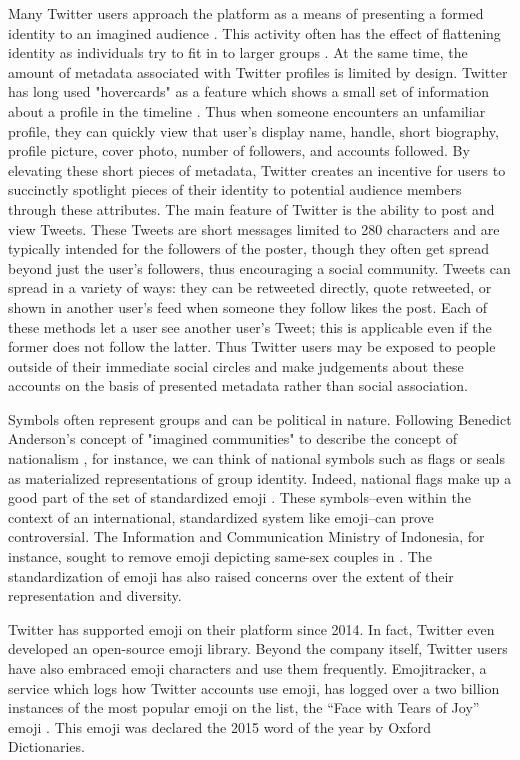 Many Twitter users approach the platform as a means of presenting a
formed identity to an imagined audience \cite{marwick2011tweet}. This
activity often has the effect of flattening identity as individuals
try to fit in to larger groups \cite{boyd2008taken}. At the same time,
the amount of metadata associated with Twitter profiles is limited by
design. Twitter has long used "hovercards" as a feature which shows
a small set of information about a profile in the
timeline \cite{twitterhover}. Thus when someone encounters an
unfamiliar profile, they can quickly view that user’s display name,
handle, short biography, profile picture, cover photo, number of
followers, and accounts followed. By elevating these short pieces of
metadata, Twitter creates an incentive for users to succinctly
spotlight pieces of their identity to potential audience members
through these attributes.  The main feature of Twitter is the ability
to post and view Tweets. These Tweets are short messages limited to
280 characters and are typically intended for the followers of the
poster, though they often get spread beyond just the user’s followers,
thus encouraging a social community. Tweets can spread in a variety of
ways: they can be retweeted directly, quote retweeted, or shown in
another user’s feed when someone they follow likes the post. Each of
these methods let a user see another user’s Tweet; this is applicable
even if the former does not follow the latter. Thus Twitter users may
be exposed to people outside of their immediate social circles and
make judgements about these accounts on the basis of presented
metadata rather than social association.

Symbols often represent groups and can be political in
nature. Following Benedict Anderson’s concept of "imagined
communities" to describe the concept of
nationalism \cite{anderson2006imagined}, for instance, we can think of
national symbols such as flags or seals as materialized
representations of group identity. Indeed, national flags make up a
good part of the set of standardized emoji \cite{unicodeemoji}. These
symbols–even within the context of an international, standardized
system like emoji–can prove controversial. The Information and
Communication Ministry of Indonesia, for instance, sought to remove
emoji depicting same-sex couples in
\cite{boellstorff2016against}. The standardization of emoji has
also raised concerns over the extent of their representation and
diversity.

Twitter has supported emoji on their platform since 2014. In fact,
Twitter even developed an open-source emoji library. Beyond the
company itself, Twitter users have also embraced emoji characters and
use them frequently. Emojitracker, a service which logs how Twitter
accounts use emoji, has logged over a two billion instances of the
most popular emoji on the list, the “Face with Tears of Joy”
emoji \cite{emojitracker}. This emoji was declared the 2015 word of the
year by Oxford Dictionaries.

